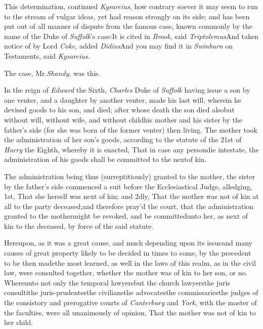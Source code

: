 \documentclass[twoside]{article}
\begin{document}
This determination, continued \textit{Kysarcius}, how
contrary soever it may seem\break
to run to the stream of vulgar ideas,\break
yet had reason strongly on its side; and has been put out of all
manner of dispute from the famous case, known commonly by the name
of the Duke of \textit{Suffolk}’s case:\tsh It is
cited in \textit{Brook}, said \textit{Triptolemus}\tsh And
taken notice of by Lord \textit{Coke}, added \textit{Didius}\tsk And
you may find it in \textit{Swinburn} on Testaments, said
\textit{Kysarcius.}

The case, Mr.\@ \textit{Shandy}, was this.

In the reign of \textit{Edward} the Sixth,\break
\textit{Charles} Duke of \textit{Suffolk} having issue a son
by one venter, and a daughter by\break
another venter, made his last will,\break
wherein he devised goods to his son,\break
and died; after whose death the son died also\tsk but
without will, without wife, and without child\tsk his mother and
his sister by the father’s side (for she was born of the
former venter) then living. The mother took the administration of
her son’s goods, according to the statute of the 21st of \textit{Harry} the Eighth, whereby it is
enacted, That in case any person\break die intestate, the administration
of his goods shall be committed to the next\break of kin.

The administration being thus (surreptitiously) granted to the
mother, the sister by the father’s side commenced a suit
before the Ecclesiastical Judge, al\-ledging, 1st, That she herself
was next of kin; and 2dly, That the mother was not of kin at all to
the party deceased;\break and therefore pray’d the court, that the
administration granted to the mother\break might be revoked, and be
committed\break unto her, as next of kin to the deceased, by force of the
said statute.

Hereupon, as it was a great cause, and much depending upon its issue\tsk and many
causes of great property likely to be decided in times to come, by the precedent to
be then made\tsh the most learned, as well in the laws of this realm, as in the
civil law, were consulted together, whether the mother was
of kin to her son, or no.
\tsk Whereunto not only the temporal lawyers\tsk but the church lawyers\tsk the
juris consulti\tsk the juris-prudentes\tsk the civilians\tsk the advocates\tsk the
commissaries\tsk the judges of the consistory and prerogative courts of
\textit{Canterbury} and \textit{York}, with the master of the faculties, were all
unanimously of opinion, That the mother was not of \fnast\break
kin to her child.\tsh
\end{document}
